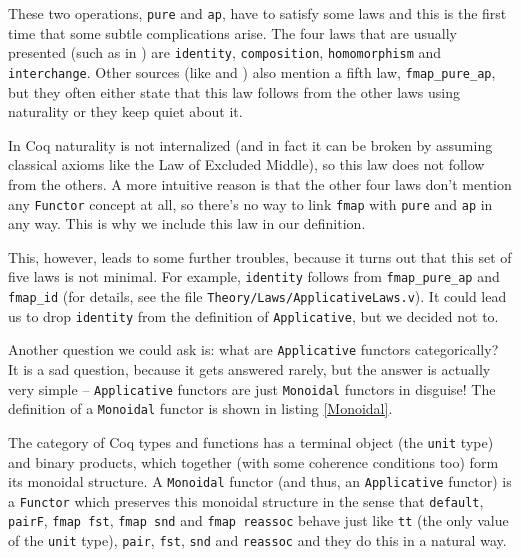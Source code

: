 \documentclass[declaration,inz,english,shortabstract]{iithesis}
\newcommand{\m}[1]{\texttt{#1}}
\begin{document}
These two operations, \m{pure} and \m{ap}, have to satisfy some laws and this is the first time that some subtle complications arise. The four laws that are usually presented (such as in \cite{LYAH}) are \m{identity}, \m{composition}, \m{homomorphism} and \m{interchange}. Other sources (like \cite{HackageApplicative} and \cite{WikibooksApplicative}) also mention a fifth law, \m{fmap\_pure\_ap}, but they often either state that this law follows from the other laws using naturality or they keep quiet about it.

In Coq naturality is not internalized (and in fact it can be broken by assuming classical axioms like the Law of Excluded Middle), so this law does not follow from the others. A more intuitive reason is that the other four laws don't mention any \m{Functor} concept at all, so there's no way to link \m{fmap} with \m{pure} and \m{ap} in any way. This is why we include this law in our definition.

This, however, leads to some further troubles, because it turns out that this set of five laws is not minimal. For example, \m{identity} follows from \m{fmap\_pure\_ap} and \m{fmap\_id} (for details, see the file \m{Theory/Laws/ApplicativeLaws.v}). It could lead us to drop \m{identity} from the definition of \m{Applicative}, but we decided not to.


Another question we could ask is: what are \m{Applicative} functors categorically? It is a sad question, because it gets answered rarely, but the answer is actually very simple -- \m{Applicative} functors are just \m{Monoidal} functors in disguise! The definition of a \m{Monoidal} functor is shown in listing \ref{Monoidal}. 

The category of Coq types and functions has a terminal object (the \m{unit} type) and binary products, which together (with some coherence conditions too) form its monoidal structure. A \m{Monoidal} functor (and thus, an \m{Applicative} functor) is a \m{Functor} which preserves this monoidal structure in the sense that \m{default}, \m{pairF}, \m{fmap fst}, \m{fmap snd} and \m{fmap reassoc} behave just like \m{tt} (the only value of the \m{unit} type), \m{pair}, \m{fst}, \m{snd} and \m{reassoc} and they do this in a natural way.
\end{document}
